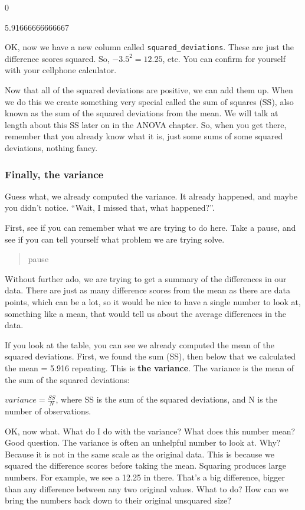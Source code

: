 \documentclass[
]{book}
\begin{document}
0

5.91666666666667

OK, now we have a new column called \texttt{squared\_deviations}. These are just the difference scores squared. So, \(-3.5^2 = 12.25\), etc. You can confirm for yourself with your cellphone calculator.

Now that all of the squared deviations are positive, we can add them up. When we do this we create something very special called the sum of squares (SS), also known as the sum of the squared deviations from the mean. We will talk at length about this SS later on in the ANOVA chapter. So, when you get there, remember that you already know what it is, just some sums of some squared deviations, nothing fancy.

\hypertarget{finally-the-variance}{%
\subsubsection{Finally, the variance}\label{finally-the-variance}}

Guess what, we already computed the variance. It already happened, and maybe you didn't notice. ``Wait, I missed that, what happened?''.

First, see if you can remember what we are trying to do here. Take a pause, and see if you can tell yourself what problem we are trying solve.

\begin{quote}
pause
\end{quote}

Without further ado, we are trying to get a summary of the differences in our data. There are just as many difference scores from the mean as there are data points, which can be a lot, so it would be nice to have a single number to look at, something like a mean, that would tell us about the average differences in the data.

If you look at the table, you can see we already computed the mean of the squared deviations. First, we found the sum (SS), then below that we calculated the mean = 5.916 repeating. This is \textbf{the variance}. The variance is the mean of the sum of the squared deviations:

\(variance = \frac{SS}{N}\), where SS is the sum of the squared deviations, and N is the number of observations.

OK, now what. What do I do with the variance? What does this number mean? Good question. The variance is often an unhelpful number to look at. Why? Because it is not in the same scale as the original data. This is because we squared the difference scores before taking the mean. Squaring produces large numbers. For example, we see a 12.25 in there. That's a big difference, bigger than any difference between any two original values. What to do? How can we bring the numbers back down to their original unsquared size?
\end{document}
